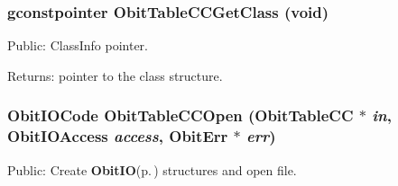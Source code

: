 \subsubsection{\setlength{\rightskip}{0pt plus 5cm}gconstpointer Obit\-Table\-CCGet\-Class (void)}\label{ObitTableCC_8h_a13}


Public: Class\-Info pointer. 

\begin{Desc}
\item[Returns:]pointer to the class structure. \end{Desc}
\subsubsection{\setlength{\rightskip}{0pt plus 5cm}Obit\-IOCode Obit\-Table\-CCOpen ({\bf Obit\-Table\-CC} $\ast$ {\em in}, Obit\-IOAccess {\em access}, {\bf Obit\-Err} $\ast$ {\em err})}\label{ObitTableCC_8h_a17}


Public: Create {\bf Obit\-IO}{\rm (p.\,\pageref{structObitIO})} structures and open file. 

